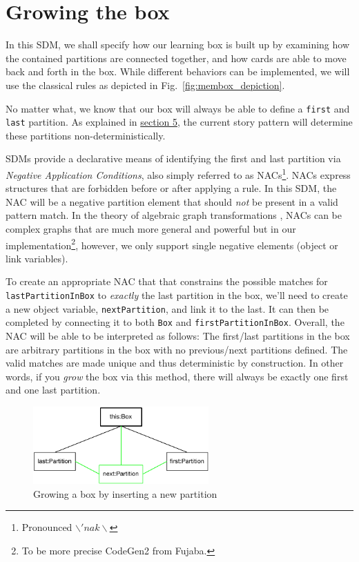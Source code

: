 \newpage
\section{Growing the box}
\genHeader
\hypertarget{sec:growBox}{}

In this SDM, we shall specify how our learning box is built up by examining how the contained partitions are connected together, and how cards are able to
move back and forth in the box. While different behaviors can be implemented, we will use the classical rules as depicted in Fig.~\ref{fig:membox_depiction}.

No matter what, we know that our box will always be able to define a \texttt{first} and \texttt{last} partition. As explained in
\hyperlink{sec:emptyPartition}{section 5}, the current story pattern will determine these partitions non-deterministically.

SDMs provide a declarative means of identifying the first and last partition via \emph{Negative Application Conditions}, also simply referred to as
\mbox{NACs}\footnote{Pronounced $\backslash 'nak \backslash$}. \mbox{NAC}s express structures that are forbidden before or after applying a
rule. In this SDM, the \mbox{NAC} will be a negative partition element that should \emph{not} be present in a valid pattern match. In the theory of algebraic
graph transformations \cite{EEPT06}, \mbox{NACs} can be complex graphs that are much more general and powerful but in our implementation\footnote{To be more
precise CodeGen2 from Fujaba.}, however, we only support single negative elements (object or link variables).

To create an appropriate \mbox{NAC} that that constrains the possible matches for \texttt{lastPartitionInBox} to \emph{exactly} the last partition in the box,
we'll need to create a new object variable, \texttt{nextPartition}, and link it to the last. It can then be completed by connecting it to both \texttt{Box} and
\texttt{firstPartitionInBox}. Overall, the NAC will be able to be interpreted as follows:
The first/last partitions in the box are arbitrary partitions in the box with no previous/next partitions defined. The valid matches are made unique and thus
deterministic by construction. In other words, if you \emph{grow} the box via this method, there will always be exactly one first and one last partition.

\begin{figure}[htbp]
 	\centering
  \includegraphics[width=0.6\textwidth]{goal_growBox.pdf}
	\caption{Growing a box by inserting a new partition}
	\label{fig:goal_grow}
\end{figure}
\FloatBarrier

